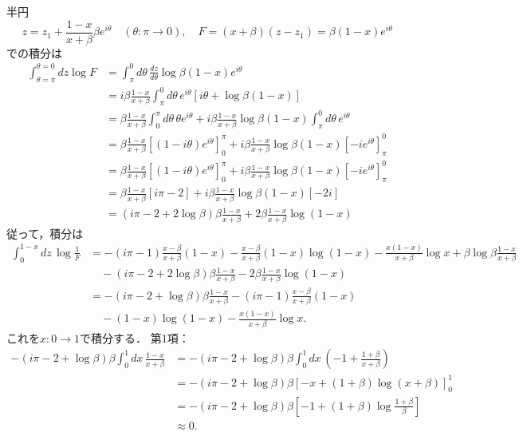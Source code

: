 半円
\[
z = z_1 + \frac{1-x}{x+\beta} \beta e^{i\theta} \quad (\theta \colon \pi \to 0)
, \quad F = (x + \beta)(z - z_1) = \beta (1 - x) e^{i\theta}
\]
での積分は
\begin{align*}
   \int_{\theta=\pi}^{\theta=0} dz \log F
  &= \int_\pi^0 d\theta \, \frac{dz}{d\theta} \log \beta (1-x) e^{i\theta} \\
  &= i \beta \frac{1-x}{x+\beta} \int_\pi^0 d\theta \, e^{i\theta} [i \theta + \log \beta (1-x)] \\
  &= \beta \frac{1-x}{x+\beta} \int_0^\pi d\theta \, \theta e^{i\theta}
  + i \beta \frac{1-x}{x+\beta} \log \beta (1-x) \int_\pi^0 d\theta \, e^{i\theta} \\
  &= \beta \frac{1-x}{x+\beta} \left[ (1-i\theta) e^{i\theta} \right]_0^\pi
  + i \beta \frac{1-x}{x+\beta} \log \beta (1-x) \left[ -i e^{i\theta} \right]_\pi^0 \\
  &= \beta \frac{1-x}{x+\beta} \left[ (1-i\theta) e^{i\theta} \right]_0^\pi
  + i \beta \frac{1-x}{x+\beta} \log \beta (1-x) \left[ -i e^{i\theta} \right]_\pi^0 \\
  &= \beta \frac{1-x}{x+\beta} \left[ i\pi - 2 \right]
  + i \beta \frac{1-x}{x+\beta} \log \beta (1-x) \left[ -2i \right] \\
  &= (i\pi - 2 + 2\log \beta) \beta \frac{1-x}{x+\beta} + 2 \beta \frac{1-x}{x+\beta} \log (1-x)
\end{align*}
従って，積分は
\begin{align*}
  \int_0^{1-x} dz \, \log \frac{1}{F} &= - (i\pi - 1) \frac{x-\beta}{x+\beta}(1-x) -\frac{x-\beta}{x+\beta}(1-x) \log (1-x)
  - \frac{x(1-x)}{x+\beta} \log x + \beta \log \beta \frac{1-x}{x+\beta} \\
  & \quad - (i\pi - 2 + 2\log \beta) \beta \frac{1-x}{x+\beta} - 2 \beta \frac{1-x}{x+\beta} \log (1-x) \\
  &= - (i\pi - 2 + \log \beta) \beta \frac{1-x}{x+\beta} - (i\pi - 1) \frac{x-\beta}{x+\beta}(1-x) \\
  & \quad - (1-x) \log (1-x) - \frac{x(1-x)}{x+\beta} \log x .
\end{align*}
これを$x \colon 0 \to 1$で積分する．
第1項：
\begin{align*}
  - (i\pi - 2 + \log \beta) \beta \int_0^1 dx \, \frac{1-x}{x+\beta}
  &= - (i\pi - 2 + \log \beta) \beta \int_0^1 dx \, \left( -1 + \frac{1+\beta}{x+\beta} \right) \\
  &= - (i\pi - 2 + \log \beta) \beta \left[ -x + (1+\beta) \log (x+\beta) \right]_0^1 \\
  &= - (i\pi - 2 + \log \beta) \beta \left[ -1 + (1+\beta) \log \frac{1+\beta}{\beta} \right] \\
  &\approx 0 .
\end{align*}
